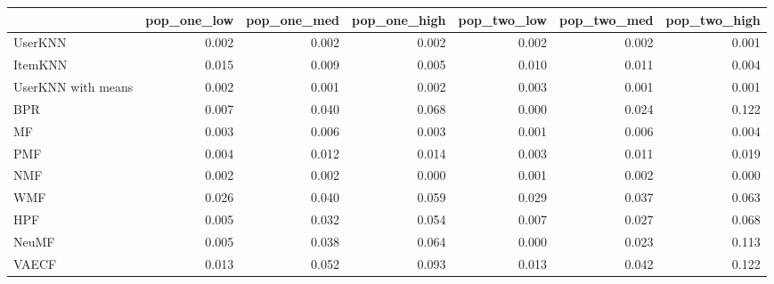 \begin{tabular}{lrrrrrr}
\toprule
{} &  pop\_one\_low &  pop\_one\_med &  pop\_one\_high &  pop\_two\_low &  pop\_two\_med &  pop\_two\_high \\
\midrule
UserKNN            &        0.002 &        0.002 &         0.002 &        0.002 &        0.002 &         0.001 \\
ItemKNN            &        0.015 &        0.009 &         0.005 &        0.010 &        0.011 &         0.004 \\
UserKNN with means &        0.002 &        0.001 &         0.002 &        0.003 &        0.001 &         0.001 \\
BPR                &        0.007 &        0.040 &         0.068 &        0.000 &        0.024 &         0.122 \\
MF                 &        0.003 &        0.006 &         0.003 &        0.001 &        0.006 &         0.004 \\
PMF                &        0.004 &        0.012 &         0.014 &        0.003 &        0.011 &         0.019 \\
NMF                &        0.002 &        0.002 &         0.000 &        0.001 &        0.002 &         0.000 \\
WMF                &        0.026 &        0.040 &         0.059 &        0.029 &        0.037 &         0.063 \\
HPF                &        0.005 &        0.032 &         0.054 &        0.007 &        0.027 &         0.068 \\
NeuMF              &        0.005 &        0.038 &         0.064 &        0.000 &        0.023 &         0.113 \\
VAECF              &        0.013 &        0.052 &         0.093 &        0.013 &        0.042 &         0.122 \\
\bottomrule
\end{tabular}
